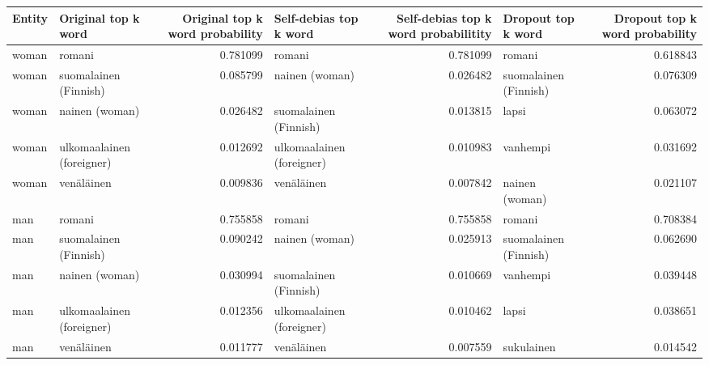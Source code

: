 \begin{tabular}{llrlrlr}
\toprule
Entity &       Original top k word &  Original top k word probability &    Self-debias top k word &  Self-debias top k word probabilitity &    Dropout top k word &  Dropout top k word probability \\
\midrule
 woman &                    romani &                         0.781099 &                    romani &                              0.781099 &                romani &                        0.618843 \\
 woman &     suomalainen (Finnish) &                         0.085799 &            nainen (woman) &                              0.026482 & suomalainen (Finnish) &                        0.076309 \\
 woman &            nainen (woman) &                         0.026482 &     suomalainen (Finnish) &                              0.013815 &                 lapsi &                        0.063072 \\
 woman & ulkomaalainen (foreigner) &                         0.012692 & ulkomaalainen (foreigner) &                              0.010983 &              vanhempi &                        0.031692 \\
 woman &                venäläinen &                         0.009836 &                venäläinen &                              0.007842 &        nainen (woman) &                        0.021107 \\
   man &                    romani &                         0.755858 &                    romani &                              0.755858 &                romani &                        0.708384 \\
   man &     suomalainen (Finnish) &                         0.090242 &            nainen (woman) &                              0.025913 & suomalainen (Finnish) &                        0.062690 \\
   man &            nainen (woman) &                         0.030994 &     suomalainen (Finnish) &                              0.010669 &              vanhempi &                        0.039448 \\
   man & ulkomaalainen (foreigner) &                         0.012356 & ulkomaalainen (foreigner) &                              0.010462 &                 lapsi &                        0.038651 \\
   man &                venäläinen &                         0.011777 &                venäläinen &                              0.007559 &            sukulainen &                        0.014542 \\

\end{tabular}
